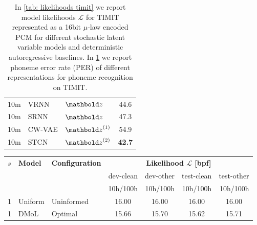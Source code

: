 {\begin{table}[t]
\begin{subtable}[t]{.45\textwidth}
\begin{adjustbox}{center, totalheight=0.35\paperheight}
\begin{tabular}[t]{cll|c}
        10m    &  VRNN            & $\zb$         &   44.6   \\  %
        10m    &  SRNN            & $\zb$         &   47.3   \\  %
        10m    &  CW-VAE          & $\zb^{(1)}$   &   54.9   \\  %
        10m    &  STCN            & $\zb^{(2)}$   &   \textbf{42.7}   \\  %
\bottomrule
    \end{tabular}
    \end{adjustbox}
    \vspace{1mm}
    \caption{}
    \vspace{-1mm}
    \label{tab: phoneme recognition (PER)}
    \end{subtable}%
    \caption[Model likelihoods and phoneme error rate for TIMIT.]{In \cref{tab: likelihoods timit} we report model likelihoods $\mathcal{L}$ for TIMIT represented as a 16bit $\mu$-law encoded PCM for different stochastic latent variable models and deterministic autoregressive baselines. 
    In \cref{tab: phoneme recognition (PER)} we report phoneme error rate (PER) of different representations for phoneme recognition on TIMIT. 
    }
\end{table}
%
\begin{table*}[t]
    \centering
    \begin{adjustbox}{center, totalheight=0.182\paperheight}
    \begin{tabular}{lll|rrrr}  %
        \toprule
        $s$ & \bfseries Model                   & \bfseries Configuration       & \multicolumn{4}{c}{\bfseries Likelihood $\mathcal{L}$ [bpf]} \\
            & & & dev-clean & dev-other & test-clean & test-other\\
            & & & 10h/100h & 10h/100h & 10h/100h & 10h/100h\\
        \midrule
        1 & Uniform             & Uninformed     & \multicolumn{1}{c}{16.00} & \multicolumn{1}{c}{16.00} & \multicolumn{1}{c}{16.00} & \multicolumn{1}{c}{16.00} \\
        1 & DMoL                & Optimal        & \multicolumn{1}{c}{15.66} & \multicolumn{1}{c}{15.70} & \multicolumn{1}{c}{15.62} & \multicolumn{1}{c}{15.71}\\   %

\end{tabular}
\end{adjustbox}
\end{table*}}
